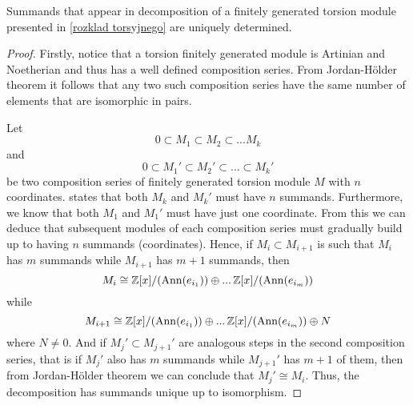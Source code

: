 \begin{lemma}
  Summands that appear in decomposition of a finitely generated torsion module presented in \cref{rozklad torsyjnego} are uniquely determined.
\end{lemma}

\begin{proof}
  Firstly, notice that a torsion finitely generated module is Artinian and Noetherian and thus has a well defined composition series. From Jordan-H\"older theorem it follows that any two such composition series have the same number of elements that are isomorphic in pairs.

  Let 
  $$0\subset M_1\subset M_2\subset...M_k$$ 
  and 
  $$0\subset M_1'\subset M_2'\subset...\subset M_k'$$ 
  be two composition series of finitely generated torsion module $M$ with $n$ coordinates.  states that both $M_k$ and $M_k'$ must have $n$ summands. Furthermore, we know that both $M_1$ and $M_1'$ must have just one coordinate. From this we can deduce that subsequent modules of each composition series must gradually build up to having $n$ summands (coordinates). Hence, if $M_i\subset M_{i+1}$ is such that $M_i$ has $m$ summands while $M_{i+1}$ has $m+1$ summands, then 
  $$M_i\cong \operatorname{\mathbb{Z}}[x]/(\operatorname{Ann}(e_{i_1}))\oplus...\operatorname{\mathbb{Z}}[x]/(\operatorname{Ann}(e_{i_m}))$$
  while
  $$M_{i+1}\cong \operatorname{\mathbb{Z}}[x]/(\operatorname{Ann}(e_{i_1}))\oplus...\operatorname{\mathbb{Z}}[x]/(\operatorname{Ann}(e_{i_m}))\oplus N$$
  where $N\neq 0$. And if $M_j'\subset M_{j+1}'$ are analogous steps in the second composition series, that is if $M_j'$ also has $m$ summands while $M_{j+1}'$ has $m+1$ of them, then from Jordan-H\"older theorem we can conclude that $M_j'\cong M_i$. Thus, the decomposition has summands unique up to isomorphism.
\end{proof}

